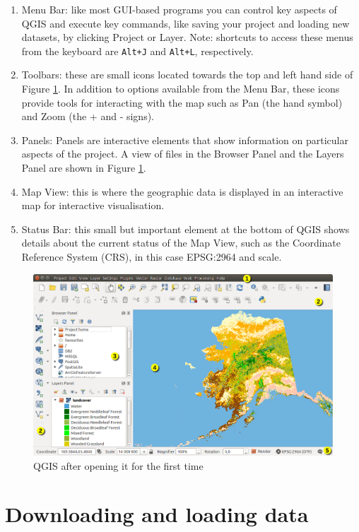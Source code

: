 \documentclass[10pt,a5paper,]{book}
\providecommand{\tightlist}{%
  \setlength{\itemsep}{0pt}\setlength{\parskip}{0pt}}
\begin{document}
\begin{enumerate}
\def\labelenumi{\arabic{enumi}.}
\tightlist
\item
  Menu Bar: like most GUI-based programs you can control key aspects of QGIS and execute key commands, like saving your project and loading new datasets, by clicking Project or Layer. Note: shortcuts to access these menus from the keyboard are \texttt{Alt+J} and \texttt{Alt+L}, respectively.
\item
  Toolbars: these are small icons located towards the top and left hand side of Figure \ref{fig:qgis-window}. In addition to options available from the Menu Bar, these icons provide tools for interacting with the map such as Pan (the hand symbol) and Zoom (the + and - signs).
\item
  Panels: Panels are interactive elements that show information on particular aspects of the project. A view of files in the Browser Panel and the Layers Panel are shown in Figure \ref{fig:qgis-window}.
\item
  Map View: this is where the geographic data is displayed in an interactive map for interactive visualisation.
\item
  Status Bar: this small but important element at the bottom of QGIS shows details about the current status of the Map View, such as the Coordinate Reference System (CRS), in this case EPSG:2964 and scale.
\end{enumerate}

\begin{figure}
\includegraphics[width=1\linewidth]{figures/startup} \caption{QGIS after opening it for the first time}\label{fig:qgis-window}
\end{figure}

\hypertarget{data}{%
\chapter{Downloading and loading data}\label{data}}
\end{document}
